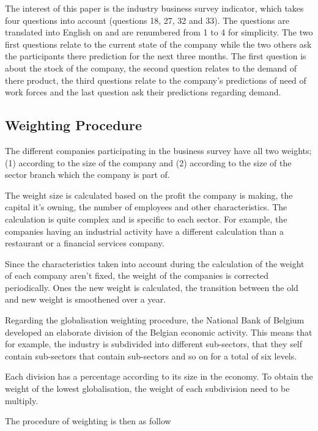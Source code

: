 \documentclass[12pt,a4paper,oneside]{book}
\begin{document}
The interest of this paper is the industry business survey indicator, which takes four questions into account (questions 18, 27, 32 and 33). The questions are translated into English on  and are renumbered from 1 to 4 for simplicity.
The two first questions relate to the current state of the company while the two others ask the participants there prediction for the next three months.
The first question is about the stock of the company, 
the second question relates to the demand of there product, 
the third questions relate to the company's predictions of need of work forces 
and the last question ask their predictions regarding demand.


\subsection{Weighting Procedure}
\label{sec:Weighting procedure}

The different companies participating in the business survey have all two weights; (1) according to the size of the company and (2) according to the size of the sector branch which the company is part of.

The weight size is calculated based on the profit the company is making, the capital it's owning, the number of employees and other characteristics. 
The calculation is quite complex and is specific to each sector. 
For example, the companies having an industrial activity have a different calculation than a restaurant or a financial services company.

Since the characteristics taken into account during the calculation of the weight of each company aren't fixed, the weight of the companies is corrected periodically. 
Ones the new weight is calculated, the transition between the old and new weight is smoothened over a year.

Regarding the globalisation weighting procedure, the National Bank of Belgium developed an elaborate division of the Belgian economic activity. This means that for example, the industry is subdivided into different sub-sectors, that they self contain sub-sectors that contain sub-sectors and so on for a total of six levels. 

Each division has a percentage according to its size in the economy.
To obtain the weight of the lowest globalisation, the weight of each subdivision need to be multiply. 

The procedure of weighting is then as follow
\end{document}
